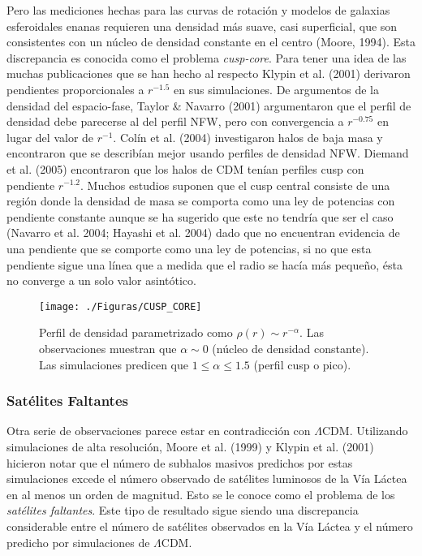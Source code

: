 \documentclass[a4paper,openright,12pt]{book}
\begin{document}
Pero las mediciones hechas para las curvas de rotación y modelos de galaxias esferoidales enanas requieren una densidad más suave, casi superficial, que son consistentes con un núcleo de densidad constante en el centro (Moore, 1994)\cite{b2}. Esta discrepancia es conocida como el problema \textit{cusp-core}.  Para tener una idea de las muchas publicaciones que se han hecho al respecto Klypin et al. (2001) derivaron pendientes proporcionales a $r^{-1.5}$ en sus simulaciones. De argumentos de la densidad del espacio-fase, Taylor \& Navarro (2001) argumentaron que el perfil de densidad debe parecerse al del perfil NFW, pero con convergencia a $r^{-0.75}$ en lugar del valor de $r^{-1}$. Colín et al. (2004) investigaron halos de baja masa y encontraron que se describían mejor usando perfiles de densidad NFW. Diemand et al. (2005) encontraron que los halos de CDM tenían perfiles cusp con pendiente $r^{-1.2}$. 
Muchos estudios suponen que el cusp central consiste de una región donde la densidad de masa se comporta como una ley de potencias con pendiente constante aunque se ha sugerido que este no tendría que ser el caso (Navarro et al. 2004; Hayashi et al. 2004) \cite{Navarro Hayashi} dado que no encuentran evidencia de una pendiente que se comporte como una ley de potencias, si no que esta pendiente sigue una línea que a medida que el radio se hacía más pequeño, ésta no converge a un solo valor asintótico.
\begin{figure}
\centering
  \texttt{[image: ./Figuras/CUSP\_CORE]}
  \caption{\footnotesize{Perfil de densidad parametrizado como $\rho(r) \sim r^{-\alpha}$. Las observaciones muestran que $\alpha \sim 0$ (núcleo de densidad constante). Las simulaciones predicen que $1 \leq \alpha \leq 1.5$ (perfil cusp o pico).}}
  \label{fig 1.8}
\end{figure}


\subsubsection*{Satélites Faltantes}
Otra serie de observaciones parece estar en contradicción con $\Lambda$CDM. Utilizando simulaciones de alta resolución, Moore et al. (1999) \cite{Moore 1999} y Klypin et al. (2001) \cite{1.2.4} hicieron notar que el número de subhalos masivos predichos por estas simulaciones excede el número observado de satélites luminosos de la Vía Láctea en al menos un orden de magnitud. Esto se le conoce como el problema de los \textit{satélites faltantes}. Este tipo de resultado sigue siendo una discrepancia considerable entre el número de satélites observados en la Vía Láctea y el número predicho por simulaciones de $\Lambda$CDM.
\end{document}
